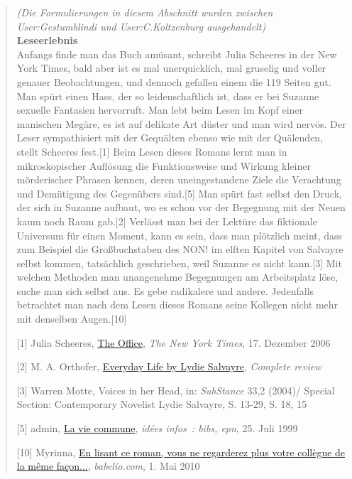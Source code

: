 \documentclass[fontsize=12pt]{scrartcl}
\begin{document}
\begin{quote}
\textit{(Die Formulierungen in diesem Abschnitt wurden zwischen User:Ges\-tum\-blindi und User:C.Koltzenburg ausgehandelt)}\\
\textbf{Leseerlebnis}\\
Anfangs finde man das Buch am\"usant, schreibt Julia Scheeres in der New York Times, bald aber ist es mal unerquicklich, mal gruselig und voller genauer Beobachtungen, und dennoch gefallen einem die 119 Sei\-ten gut. Man sp\"urt einen Hass, der so leidenschaftlich ist, dass er bei Suzanne sexuelle Fantasien hervorruft. Man lebt beim Lesen im Kopf einer manischen Meg\"are, es ist auf delikate Art d\"uster und man wird nerv\"os. Der Leser sympathisiert mit der Gequ\"alten ebenso wie mit der Qu\"alenden, stellt Scheeres fest.[1] Beim Lesen dieses Romans lernt man in mikroskopi\-scher Auf\-l\"osung die Funktionsweise und Wirkung kleiner m\"orderischer Phrasen kennen, deren uneingestandene Ziele die Verachtung und Dem\"utigung des Gegen\"ubers sind.[5] Man sp\"urt fast \mbox{selbst} den Druck, der sich in Suzanne aufbaut, wo es schon vor der Begegnung mit der Neuen kaum noch Raum gab.[2] Verl\"asst man bei der Lekt\"ure das fiktionale Universum f\"ur einen Moment, kann es sein, dass man pl\"otzlich meint, dass zum Beispiel die Gro{\ss}buchstaben des NON! im elften Kapitel von Salvayre \mbox{selbst} kommen, tats\"achlich geschrieben, weil Suzanne es nicht kann.[3] Mit welchen Me\-tho\-den man unangenehme Begegnungen am Arbeitsplatz l\"ose, suche man sich \mbox{selbst} aus. Es gebe radikalere und andere. Jedenfalls betrachtet man nach dem Lesen dieses Romans seine Kollegen nicht mehr mit denselben Augen.[10]

{\tiny[1] Julia Scheeres, \href{http://query.nytimes.com/gst/fullpage.html?res=9E0CE2DF1731F934A25751C1A9609C8B63}{The Office}, \textit{The New York Times}, 17. Dezember 2006\par}
{\tiny[2] M. A. Orthofer, \href{http://www.complete-review.com/reviews/salvayre/everyday.htm}{Everyday Life by Lydie Salvayre}, \textit{Complete review}\par}
{\tiny[3] Warren Motte, Voices in her Head, in: \textit{SubStance} 33,2 (2004)/ Special Section: Contemporary Novelist Lydie Salvayre, S. 13-29, S. 18, 15\par}
{\tiny[5] admin, \href{http://ideesinfos.free.fr/?p=15}{La vie commune}, \textit{id\'{e}es infos : bibs, epn}, 25. Juli 1999\par}
{\tiny[10] Myrinna, \href{http://www.babelio.com/livres/Salvayre-La-vie-commune/8457/critiques/33911}{En lisant ce roman, vous ne regarderez plus votre coll\`{e}gue de la m\^{e}me fa\c{c}on...}, \textit{babelio.com}, 1. Mai 2010\par}
\end{quote}
\end{document}
